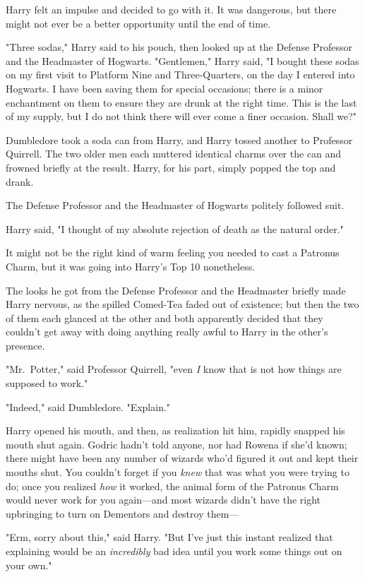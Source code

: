 Harry felt an impulse and decided to go with it. It was dangerous, but there
might not ever be a better opportunity until the end of time.

"Three sodas," Harry said to his pouch, then looked up at the Defense Professor
and the Headmaster of Hogwarts. "Gentlemen," Harry said, "I bought these sodas
on my first visit to Platform Nine and Three-Quarters, on the day I entered
into Hogwarts. I have been saving them for special occasions; there is a minor
enchantment on them to ensure they are drunk at the right time. This is the
last of my supply, but I do not think there will ever come a finer occasion.
Shall we?"

Dumbledore took a soda can from Harry, and Harry tossed another to Professor
Quirrell. The two older men each muttered identical charms over the can and
frowned briefly at the result. Harry, for his part, simply popped the top and
drank.

The Defense Professor and the Headmaster of Hogwarts politely followed suit.

Harry said, "I thought of my absolute rejection of death as the natural order."

It might not be the right kind of warm feeling you needed to cast a Patronus
Charm, but it was going into Harry's Top 10 nonetheless.

The looks he got from the Defense Professor and the Headmaster briefly made
Harry nervous, as the spilled Comed-Tea faded out of existence; but then the
two of them each glanced at the other and both apparently decided that they
couldn't get away with doing anything really awful to Harry in the other's
presence.

"Mr.~Potter," said Professor Quirrell, "even \emph{I} know that is not how
things are supposed to work."

"Indeed," said Dumbledore. "Explain."

Harry opened his mouth, and then, as realization hit him, rapidly snapped his
mouth shut again. Godric hadn't told anyone, nor had Rowena if she'd known;
there might have been any number of wizards who'd figured it out and kept their
mouths shut. You couldn't forget if you \emph{knew} that was what you were
trying to do; once you realized \emph{how} it worked, the animal form of the
Patronus Charm would never work for you again---and most wizards didn't have
the right upbringing to turn on Dementors and destroy them---

"Erm, sorry about this," said Harry. "But I've just this instant realized that
explaining would be an \emph{incredibly} bad idea until you work some things
out on your own."


